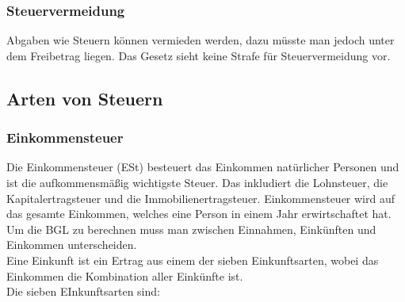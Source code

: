 \documentclass{article}
\begin{document}
	\subsubsection{Steuervermeidung}
	Abgaben wie Steuern können vermieden werden, dazu müsste man jedoch unter dem Freibetrag liegen. Das Gesetz sieht keine Strafe für Steuervermeidung vor.
	\subsection{Arten von Steuern}
	\subsubsection{Einkommensteuer}
	Die Einkommensteuer (ESt) besteuert das Einkommen natürlicher Personen und ist die aufkommensmäßig wichtigste Steuer. Das inkludiert die Lohnsteuer, die Kapitalertragsteuer und die Immobilienertragsteuer. Einkommensteuer wird auf das gesamte Einkommen, welches eine Person in einem Jahr erwirtschaftet hat. Um die BGL zu berechnen muss man zwischen Einnahmen, Einkünften und Einkommen unterscheiden. \\
	Eine Einkunft ist ein Ertrag aus einem der sieben Einkunftsarten, wobei das Einkommen die Kombination aller Einkünfte ist. \\
	Die sieben EInkunftsarten sind:
\end{document}
